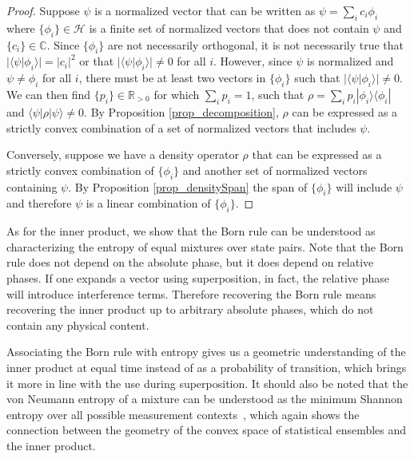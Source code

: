 \documentclass[10pt,twocolumn, nofootinbib]{revtex4-2}
\def\>{\rangle}
\def\<{\langle}
\begin{document}
\begin{proof}
Suppose $\psi$ is a normalized vector that can be written as $\psi = \sum_{i} c_i \phi_i$ where $\{\phi_i\} \in \mathcal{H}$ is a finite set of normalized vectors that does not contain $\psi$ and $\{c_i\} \in \mathbb{C}$. Since $\{\phi_i\}$ are not necessarily orthogonal, it is not necessarily true that $|\<\psi|\phi_i\>| = |c_i|^2$ or that $|\<\psi|\phi_i\>| \neq 0$ for all $i$. However, since $\psi$ is normalized and $\psi \neq \phi_i$ for all $i$, there must be at least two vectors in $\{\phi_i\}$ such that $|\<\psi|\phi_i\>| \neq 0$. We can then find $\{p_i\} \in \mathbb{R}_{>0}$ for which $\sum_i p_i =1$, such that $\rho = \sum_i p_i |\phi_i\>\<\phi_i|$ and $\<\psi|\rho|\psi\> \neq 0$. By Proposition \ref{prop_decomposition}, $\rho$ can be expressed as a strictly convex combination of a set of normalized vectors that includes $\psi$.

Conversely, suppose we have a density operator $\rho$ that can be expressed as a strictly convex combination of $\{\phi_i\}$ and another set of normalized vectors containing $\psi$. By Proposition \ref{prop_densitySpan} the span of $\{\phi_i\}$ will include $\psi$ and therefore $\psi$ is a linear combination of $\{\phi_i\}$.
\end{proof}

As for the inner product, we show that the Born rule can be understood as characterizing the entropy of equal mixtures over state pairs. Note that the Born rule does not depend on the absolute phase, but it does depend on relative phases. If one expands a vector using superposition, in fact, the relative phase will introduce interference terms. Therefore recovering the Born rule means recovering the inner product up to arbitrary absolute phases, which do not contain any physical content.

Associating the Born rule with entropy gives us a geometric understanding of the inner product at equal time instead of as a probability of transition, which brings it more in line with the use during superposition. It should also be noted that the von Neumann entropy of a mixture can be understood as the minimum Shannon entropy over all possible measurement contexts~\cite{nielsen_chuang_2010}, which again shows the connection between the geometry of the convex space of statistical ensembles and the inner product.
\end{document}

